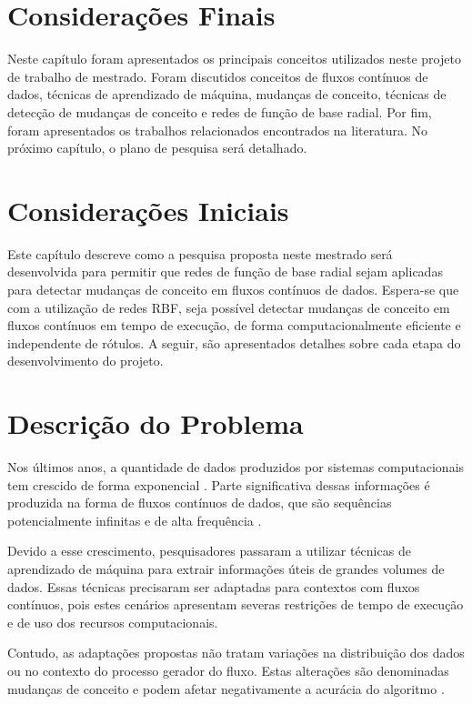 \documentclass[qual, classic, a4paper]{ufbathesis}
\begin{document}
\section{Considerações Finais}

Neste capítulo foram apresentados os principais conceitos utilizados neste projeto de trabalho de mestrado.
Foram discutidos conceitos de fluxos contínuos de dados, 
técnicas de aprendizado de máquina, 
mudanças de conceito,
técnicas de detecção de mudanças de conceito e redes de função de base radial.
Por fim, foram apresentados os trabalhos relacionados encontrados na literatura.
No próximo capítulo, o plano de pesquisa será detalhado.

 \label{plano_pesquisa}
\section{Considerações Iniciais}

Este capítulo descreve como a pesquisa proposta neste mestrado será desenvolvida para permitir que redes de função de base radial sejam aplicadas para detectar mudanças de conceito em fluxos contínuos de dados.
Espera-se que com a utilização de redes RBF, seja possível detectar mudanças de conceito em fluxos contínuos em tempo de execução, de forma computacionalmente eficiente e independente de rótulos.
A seguir, são apresentados detalhes sobre cada etapa do desenvolvimento do projeto.

\section{Descrição do Problema}

Nos últimos anos, a quantidade de dados produzidos por sistemas computacionais tem crescido de forma exponencial \cite{idc_report}.
Parte significativa dessas informações é produzida na forma de fluxos contínuos de dados, que são sequências potencialmente infinitas e de alta frequência \cite{Aggarwal:2006:DSM:1196418}.

Devido a esse crescimento, pesquisadores passaram a utilizar técnicas de aprendizado de máquina para extrair informações úteis de grandes volumes de dados.
Essas técnicas precisaram ser adaptadas para contextos com fluxos contínuos, pois estes cenários apresentam severas restrições de tempo de execução e de uso dos recursos computacionais.

Contudo, as adaptações propostas não tratam variações na distribuição dos dados ou no contexto do processo gerador do fluxo.
Estas alterações são denominadas mudanças de conceito e podem afetar negativamente a acurácia do algoritmo \cite{Gama:2014:SCD:2597757.2523813}.
\end{document}
